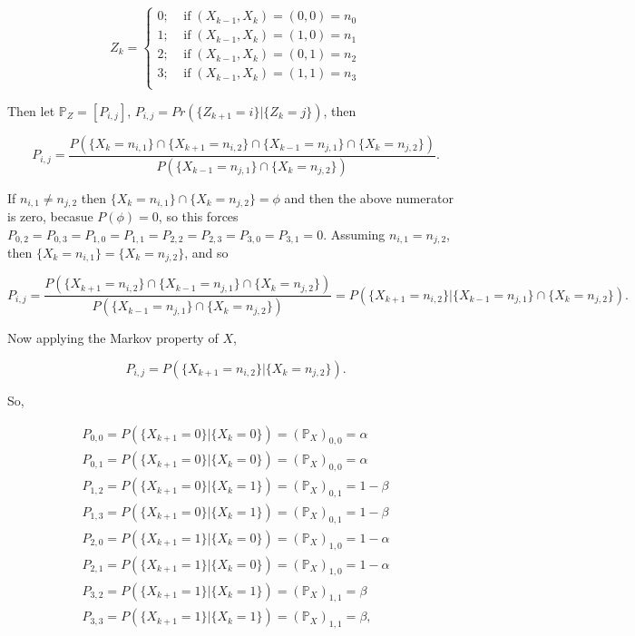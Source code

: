 \documentclass[12pt]{article}
\newcommand{\IF}[0] { \; \textrm{if} \; }
\begin{document}
$$
 Z_k = \left \{ \begin{array}{c}   
 0; \; \; \; \IF  (X_{k-1}, X_k) = (0,0) = n_0  \\   
 1; \; \; \; \IF  (X_{k-1}, X_k) = (1,0) = n_1  \\ 
 2; \; \; \; \IF  (X_{k-1}, X_k) = (0,1) = n_2  \\ 
 3; \; \; \; \IF  (X_{k-1}, X_k) = (1,1) = n_3  \\     \end{array} \right.
$$

\noindent
Then let $\mathbb{P}_Z = [ P_{i,j} ]$, $P_{i,j} = Pr( \{ Z_{k+1} = i \} | \{ Z_{k} = j  \} )$, then

$$
P_{i,j} =  \frac{ P( \{ X_k = n_{i,1} \} \cap \{ X_{k+1} = n_{i,2} \} \cap \{ X_{k-1} = n_{j,1} \} \cap \{ X_k = n_{j,2} \}  ) }{ P( \{ X_{k-1} = n_{j,1} \} \cap \{ X_k = n_{j,2} \}  ) }.
$$

If $n_{i,1} \not = n_{j,2}$ then $\{ X_k = n_{i,1} \} \cap \{ X_k = n_{j,2} \} = \phi $ and then the above numerator is zero, becasue $P(\phi) = 0$, so this forces 
$P_{0,2} = P_{0,3} = P_{1,0} = P_{1,1} = P_{2,2} = P_{2,3} = P_{3,0} = P_{3,1} = 0$. Assuming $n_{i,1} = n_{j,2}$, then  $\{ X_k = n_{i,1} \} = \{ X_k = n_{j,2} \} $, and so

$$
P_{i,j} =  \frac{ P( \{ X_{k+1} = n_{i,2} \} \cap \{ X_{k-1} = n_{j,1} \} \cap \{ X_k = n_{j,2} \}  ) }{ P( \{ X_{k-1} = n_{j,1} \} \cap \{ X_k = n_{j,2} \}  ) } = P( \{ X_{k+1} = n_{i,2} \} | \{ X_{k-1} = n_{j,1} \} \cap \{ X_k = n_{j,2} \} ).
$$

\noindent
Now applying the Markov property of $X$,

$$
P_{i,j} =  P( \{ X_{k+1} = n_{i,2} \} | \{ X_k = n_{j,2} \} ).
$$

\noindent
So,

$$
\begin{array}{c} 
P_{0,0} = P( \{ X_{k+1} = 0 \} | \{ X_k = 0 \} ) = (\mathbb{P}_X)_{0,0} = \alpha  \\  
P_{0,1} = P( \{ X_{k+1} = 0 \} | \{ X_k = 0 \} ) = (\mathbb{P}_X)_{0,0} =  \alpha  \\  
P_{1,2} = P( \{ X_{k+1} = 0 \} | \{ X_k = 1 \} ) = (\mathbb{P}_X)_{0,1} =  1-\beta  \\  
P_{1,3} = P( \{ X_{k+1} = 0 \} | \{ X_k = 1 \} ) = (\mathbb{P}_X)_{0,1} =  1-\beta  \\  
P_{2,0} = P( \{ X_{k+1} = 1 \} | \{ X_k = 0 \} ) = (\mathbb{P}_X)_{1,0} =  1-\alpha  \\  
P_{2,1} = P( \{ X_{k+1} = 1 \} | \{ X_k = 0 \} ) = (\mathbb{P}_X)_{1,0} =  1-\alpha  \\  
P_{3,2} = P( \{ X_{k+1} = 1 \} | \{ X_k = 1 \} ) = (\mathbb{P}_X)_{1,1} =  \beta  \\  
P_{3,3} = P( \{ X_{k+1} = 1 \} | \{ X_k = 1 \} ) = (\mathbb{P}_X)_{1,1} =  \beta,   \\  
\end{array} 
$$
\end{document}
